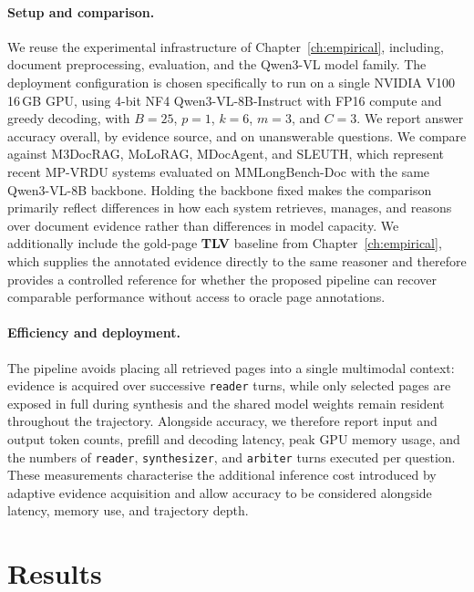 \paragraph{Setup and comparison.} We reuse the experimental infrastructure of Chapter~\ref{ch:empirical}, including, document preprocessing, evaluation, and the Qwen3-VL model family. The deployment configuration is chosen specifically to run on a single NVIDIA V100 16\,GB GPU, using 4-bit NF4 Qwen3-VL-8B-Instruct with FP16 compute and greedy decoding, with \(B=25\), \(p=1\), \(k=6\), \(m=3\), and \(C=3\). We report answer accuracy overall, by evidence source, and on unanswerable questions. We compare against M3DocRAG, MoLoRAG, MDocAgent, and SLEUTH, which represent recent MP-VRDU systems evaluated on MMLongBench-Doc with the same Qwen3-VL-8B backbone. Holding the backbone fixed makes the comparison primarily reflect differences in how each system retrieves, manages, and reasons over document evidence rather than differences in model capacity. We additionally include the gold-page \textbf{TLV} baseline from Chapter~\ref{ch:empirical}, which supplies the annotated evidence directly to the same reasoner and therefore provides a controlled reference for whether the proposed pipeline can recover comparable performance without access to oracle page annotations.

\paragraph{Efficiency and deployment.} The pipeline avoids placing all retrieved pages into a single multimodal context: evidence is acquired over successive \texttt{reader} turns, while only selected pages are exposed in full during synthesis and the shared model weights remain resident throughout the trajectory. Alongside accuracy, we therefore report input and output token counts, prefill and decoding latency, peak GPU memory usage, and the numbers of \texttt{reader}, \texttt{synthesizer}, and \texttt{arbiter} turns executed per question. These measurements characterise the additional inference cost introduced by adaptive evidence acquisition and allow accuracy to be considered alongside latency, memory use, and trajectory depth.

\section{Results}
\label{sec:simple_adaptive_results}



